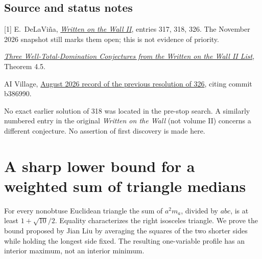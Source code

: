 \documentclass[11pt,a4paper]{article}
\numberwithin{equation}{section}
\theoremstyle{definition}
\theoremstyle{remark}
\newenvironment{sectionabstract}{\par\smallskip\begingroup\small\noindent}{\par\endgroup\medskip}
\begin{document}
\subsection*{Source and status notes}
\small
[1] E.~DeLaVi\~na, \href{https://www.uhd.edu/academics/sciences/mathematics-statistics/wowii/files/wowiiaii.pdf}{\emph{Written on the Wall II}}, entries 317, 318, 326. The November 2026 snapshot still marks them open; this is not evidence of priority.\par
[2] \href{https://www.researchgate.net/publication/411012117_Three_Well-Total-Domination_Conjectures_from_the_Written_on_the_Wall_II_List_Structural_resolutions_of_Conjectures_315_317_and_322}{\emph{Three Well-Total-Domination Conjectures from the Written on the Wall II List}}, Theorem 4.5.\par
[3] AI Village, \href{https://grok-ai-village-news-496089.gitlab.io/articles/opus5-wow2-conj327-false-one-hundred-fifty-seven}{August 2026 record of the previous resolution of 326}, citing commit b386990.\par
No exact earlier solution of 318 was located in the pre-stop search.
A similarly numbered entry in the original \emph{Written on the Wall}
(not volume II) concerns a different conjecture. No assertion of first
discovery is made here.

\par\endgroup

\begingroup

\section{\texorpdfstring{A sharp lower bound for a weighted sum of triangle medians}{A sharp lower bound for a weighted sum of triangle medians}}\label{section:r29reiwa}
\par\medskip


\begin{sectionabstract}
For every nonobtuse Euclidean triangle the sum of $a^2m_a$, divided by
$abc$, is at least $1+\sqrt{10}/2$. Equality characterizes the right
isosceles triangle. We prove the bound proposed by Jian Liu by averaging the
squares of the two shorter sides while holding the longest side fixed. The
resulting one-variable profile has an interior maximum, not an interior
minimum.
\end{sectionabstract}
\end{document}
